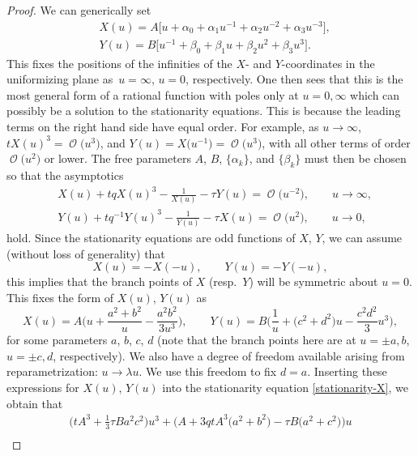 \documentclass[10pt,a4paper]{amsart}
\DeclareMathOperator{\OO}{\mathcal{O}}
\numberwithin{equation}{section}
\begin{document}
\begin{proof}
 We can generically set
 \begin{align*}
 &X(u) = A \bigl[ u + \alpha_0 + \alpha_1 u^{-1} + \alpha_2 u^{-2} + \alpha_3 u^{-3}\bigr],\\
 &Y(u) = B \bigl[ u^{-1} + \beta_0 + \beta_1 u + \beta_2 u^{2} + \beta_3 u^{3}\bigr].
 \end{align*}
This fixes the positions of the infinities of the $X$- and $Y$-coordinates in the uniformizing plane as~$u=\infty$, $u=0$, respectively.
One then sees that this is the most general form of a rational function with poles only at $u=0,\infty$ which can possibly be a solution to the stationarity equations. This is because the leading terms on the right hand side have equal order. For example, as $u\to \infty$, $tX(u)^3 = \OO\bigl(u^3\bigr)$, and $Y(u) = X\bigl(u^{-1}\bigr) = \OO\bigl(u^{3}\bigr)$, with all other terms of order $\OO\bigl(u^2\bigr)$ or lower. The free parameters $A$, $B$, $\{\alpha_k\}$,
and $\{\beta_k\}$ must then be chosen so that the asymptotics
 \begin{align*}
 &X(u) + tqX(u)^3 - \frac{1}{X(u)} - \tau Y(u) = \OO\bigl(u^{-2}\bigr),\qquad u\to \infty,\\
 &Y(u) + tq^{-1}Y(u)^3 - \frac{1}{Y(u)} - \tau X(u) = \OO\bigl(u^{2}\bigr),\qquad u \to 0,
 \end{align*}
hold. Since the stationarity equations are odd functions of $X$, $Y$, we can assume (without loss of generality) that
 \begin{equation*}
 X(u) = -X(-u), \qquad Y(u) = -Y(-u),
 \end{equation*}
this implies that the branch points of $X$ (resp.\ $Y$) will be symmetric about $u=0$. This fixes the form of $X(u)$, $Y(u)$ as
 \begin{equation*}
 X(u) = A\biggl(u + \frac{a^2+b^2}{u} -\frac{a^2b^2}{3u^3}\biggr),\qquad Y(u) = B\biggl(\frac{1}{u} + \bigl(c^2+d^2\bigr)u -\frac{c^2d^2}{3}u^3\biggr),
 \end{equation*}
for some parameters $a$, $b$, $c$, $d$ (note that the branch points here are at $u=\pm a,b$, $u=\pm c,d$, respectively). We also have a degree of freedom available arising from reparametrization: ${u\to \lambda u}$. We use this freedom to fix $d=a$. Inserting these expressions for $X(u)$, $Y(u)$ into the stationarity equation \eqref{stationarity-X}, we obtain that
 \begin{gather*}
 \biggl(tA^3 +\frac{1}{3}\tau Ba^2c^2\biggr) u^3 + \bigl(A + 3 q tA^3\bigl(a^2+b^2\bigr) - \tau B \bigl(a^2+c^2\bigr)\bigr) u \\

\end{gather*}
\end{proof}
\end{document}
